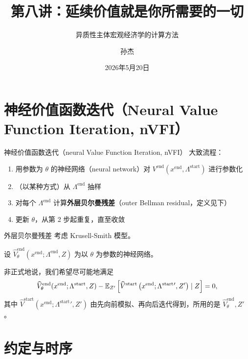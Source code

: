 \documentclass[10pt,aspectratio=169]{beamer}
\title{第八讲：延续价值就是你所需要的一切}
\subtitle{异质性主体宏观经济学的计算方法}
\author{孙杰}
\institute{多伦多大学}
\date{2026年5月20日}
\newcommand{\Vstarthat}{\widehat{V}^{\mathrm{start}}}
\newcommand{\Vendhat}{\widehat{V}^{\mathrm{end}}}
\newcommand{\Lstart}{\Lambda^{\mathrm{start}}}
\newcommand{\xend}{x^{\mathrm{end}}}
\begin{document}
\maketitle

\section[nVFI]{神经价值函数迭代（Neural Value Function Iteration, nVFI）}

\begin{frame}{神经价值函数迭代（neural Value Function Iteration, nVFI）}
  大致流程：
  \begin{enumerate}
    \item 用参数为 $\theta$ 的神经网络（neural network）对 $V^\text{end}(x^\text{end}, \Lambda^\text{start})$ 进行参数化
    \item （以某种方式）从 $\Lambda^\text{end}$ 抽样
    \item 对每个 $\Lambda^\text{end}$ 计算\textbf{外层贝尔曼残差}（outer Bellman residual，定义见下）
    \item 更新 $\theta$，从第 2 步起重复，直至收敛
  \end{enumerate}
\end{frame}

\begin{frame}{外层贝尔曼残差}
  考虑 Krusell-Smith 模型。

  设 $\Vendhat_\theta(x^\text{end}; \Lambda^\text{end}, Z)$ 为以 $\theta$ 为参数的神经网络。

  非正式地说，我们希望尽可能地满足
  \[
    \Vendhat_\theta(\xend; \Lstart, Z) - \E_{Z'}\psq{\Vstarthat\p{\xend; \Lstart{}', Z'}\mid Z} = 0,
  \]
  其中 $\Vstarthat(\xend;\Lstart{}',Z')$ 由先向前模拟、再向后迭代得到，所用的是 $\Vendhat_\theta, Z'$。
\end{frame}

\section[约定与时序]{约定与时序}
\end{document}

